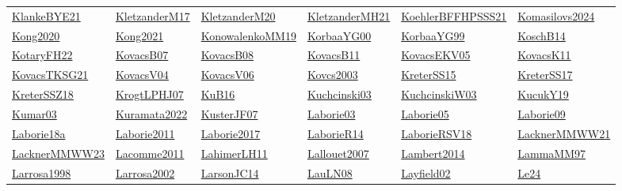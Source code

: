 \begin{longtable}{*{6}{l}}
\hyperref[detail:KlankeBYE21]{KlankeBYE21} & \hyperref[detail:KletzanderM17]{KletzanderM17} & \hyperref[detail:KletzanderM20]{KletzanderM20} & \hyperref[detail:KletzanderMH21]{KletzanderMH21} & \hyperref[detail:KoehlerBFFHPSSS21]{KoehlerBFFHPSSS21} & \hyperref[detail:Komasilovs2024]{Komasilovs2024}\\ 
\hyperref[detail:Kong2020]{Kong2020} & \hyperref[detail:Kong2021]{Kong2021} & \hyperref[detail:KonowalenkoMM19]{KonowalenkoMM19} & \hyperref[detail:KorbaaYG00]{KorbaaYG00} & \hyperref[detail:KorbaaYG99]{KorbaaYG99} & \hyperref[detail:KoschB14]{KoschB14}\\ 
\hyperref[detail:KotaryFH22]{KotaryFH22} & \hyperref[detail:KovacsB07]{KovacsB07} & \hyperref[detail:KovacsB08]{KovacsB08} & \hyperref[detail:KovacsB11]{KovacsB11} & \hyperref[detail:KovacsEKV05]{KovacsEKV05} & \hyperref[detail:KovacsK11]{KovacsK11}\\ 
\hyperref[detail:KovacsTKSG21]{KovacsTKSG21} & \hyperref[detail:KovacsV04]{KovacsV04} & \hyperref[detail:KovacsV06]{KovacsV06} & \hyperref[detail:Kovcs2003]{Kovcs2003} & \hyperref[detail:KreterSS15]{KreterSS15} & \hyperref[detail:KreterSS17]{KreterSS17}\\ 
\hyperref[detail:KreterSSZ18]{KreterSSZ18} & \hyperref[detail:KrogtLPHJ07]{KrogtLPHJ07} & \hyperref[detail:KuB16]{KuB16} & \hyperref[detail:Kuchcinski03]{Kuchcinski03} & \hyperref[detail:KuchcinskiW03]{KuchcinskiW03} & \hyperref[detail:KucukY19]{KucukY19}\\ 
\hyperref[detail:Kumar03]{Kumar03} & \hyperref[detail:Kuramata2022]{Kuramata2022} & \hyperref[detail:KusterJF07]{KusterJF07} & \hyperref[detail:Laborie03]{Laborie03} & \hyperref[detail:Laborie05]{Laborie05} & \hyperref[detail:Laborie09]{Laborie09}\\ 
\hyperref[detail:Laborie18a]{Laborie18a} & \hyperref[detail:Laborie2011]{Laborie2011} & \hyperref[detail:Laborie2017]{Laborie2017} & \hyperref[detail:LaborieR14]{LaborieR14} & \hyperref[detail:LaborieRSV18]{LaborieRSV18} & \hyperref[detail:LacknerMMWW21]{LacknerMMWW21}\\ 
\hyperref[detail:LacknerMMWW23]{LacknerMMWW23} & \hyperref[detail:Lacomme2011]{Lacomme2011} & \hyperref[detail:LahimerLH11]{LahimerLH11} & \hyperref[detail:Lallouet2007]{Lallouet2007} & \hyperref[detail:Lambert2014]{Lambert2014} & \hyperref[detail:LammaMM97]{LammaMM97}\\ 
\hyperref[detail:Larrosa1998]{Larrosa1998} & \hyperref[detail:Larrosa2002]{Larrosa2002} & \hyperref[detail:LarsonJC14]{LarsonJC14} & \hyperref[detail:LauLN08]{LauLN08} & \hyperref[detail:Layfield02]{Layfield02} & \hyperref[detail:Le24]{Le24}\\ 

\end{longtable}
